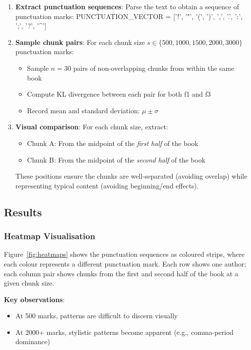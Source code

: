\documentclass{article}
\begin{document}
\begin{enumerate}
    \item \textbf{Extract punctuation sequences}: Parse the text to obtain a sequence of punctuation marks: PUNCTUATION\_VECTOR = ['!', '"', '(', ')', ',', '.', ':', ';', '?', '\^{}']

    
    \item \textbf{Sample chunk pairs}: For each chunk size $s \in \{500, 1000, 1500, 2000, 3000\}$ punctuation marks:
    \begin{itemize}
        \item Sample $n = 30$ pairs of non-overlapping chunks from within the same book
        \item Compute KL divergence between each pair for both f1 and f3
        \item Record mean and standard deviation: $\mu \pm \sigma$
    \end{itemize}
    
    \item \textbf{Visual comparison}: For each chunk size, extract:
    \begin{itemize}
        \item Chunk A: From the midpoint of the \emph{first half} of the book
        \item Chunk B: From the midpoint of the \emph{second half} of the book
    \end{itemize}
    These positions ensure the chunks are well-separated (avoiding overlap) while representing typical content (avoiding beginning/end effects).
\end{enumerate}

\subsection{Results}

\subsubsection{Heatmap Visualisation}

Figure~\ref{fig:heatmaps} shows the punctuation sequences as coloured strips, where each colour represents a different punctuation mark. Each row shows one author; each column pair shows chunks from the first and second half of the book at a given chunk size.

\textbf{Key observations}:
\begin{itemize}
    \item At 500 marks, patterns are difficult to discern visually
    \item At 2000+ marks, stylistic patterns become apparent (e.g., comma-period dominance)
\end{itemize}
\end{document}
